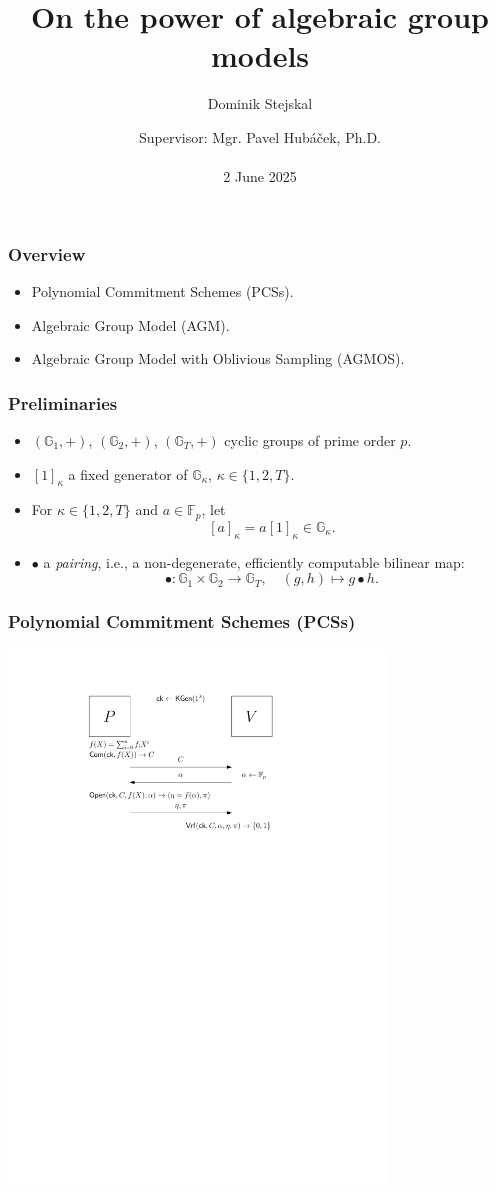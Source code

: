 \documentclass[9pt]{beamer}
\title{On the power of algebraic group models}
\author{Dominik Stejskal}
\date{Supervisor: Mgr. Pavel Hubáček, Ph.D.\\ \, \\2 June 2025}
\newcommand{\F}{\mathbb{F}}
\newcommand{\G}{\mathbb{G}}
\begin{document}
\frame{\titlepage}




\begin{frame}
\frametitle{Overview}
\begin{itemize}
    \item Polynomial Commitment Schemes (PCSs).
    \item Algebraic Group Model (AGM).
    \item Algebraic Group Model with Oblivious Sampling (AGMOS).
\end{itemize}
\end{frame}


\begin{frame}
\frametitle{Preliminaries}
\begin{itemize}
    \item $ (\G_1, +) $, $ (\G_2, +) $, $ (\G_T, +) $ cyclic groups of prime order $ p $.
    \item $ [1]_\kappa $ a fixed generator of $ \G_\kappa $, $ \kappa \in \{ 1, 2, T \} $.
    \item For $ \kappa \in \{ 1, 2, T \} $ and $ a \in \F_p $, let 
    \[
    [a]_\kappa = a[1]_\kappa \in \G_\kappa.
    \]
    \item $ \bullet $ a \textit{pairing}, i.e., a non-degenerate, efficiently computable bilinear map:
    \[
    \bullet \colon \G_1 \times \G_2 \to \G_T, \quad (g, h) \mapsto g \bullet h.
    \]
\end{itemize}
\end{frame}


\begin{frame}
\frametitle{Polynomial Commitment Schemes (PCSs)}
    \includegraphics[width=10cm]{pcs-definition.pdf}
\end{frame}
\end{document}
